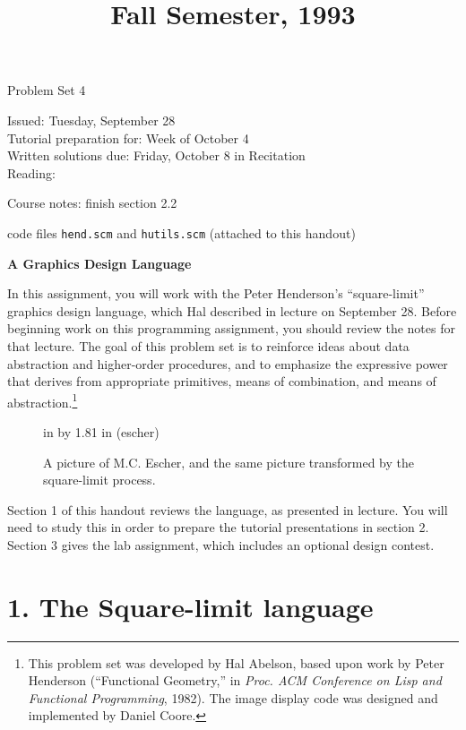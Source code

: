 \documentclass[11pt]{article}
\begin{document}
\title{Fall Semester, 1993}{Problem Set 4}

\medskip

\begin{flushleft}
Issued:  Tuesday, September 28 \\
\smallskip
Tutorial preparation for: Week of October 4\\
\smallskip
Written solutions due: Friday, October 8 in Recitation \\
\smallskip
Reading: 
\begin{tightlist}
\item Course notes: finish section 2.2
\item code files {\tt hend.scm} and {\tt hutils.scm} (attached to this handout)
\end{tightlist}
\end{flushleft}

\begin{center}
{\bf A Graphics Design Language}
\end{center}

In this assignment, you will work with the Peter Henderson's
``square-limit'' graphics design language, which Hal described in
lecture on September 28.  Before beginning work on this programming
assignment, you should review the notes for that lecture.  The goal of
this problem set is to reinforce ideas about data abstraction and
higher-order procedures, and to emphasize the expressive power that
derives from appropriate primitives, means of combination, and means
of abstraction.\footnote{This problem set was developed by Hal
Abelson, based upon work by Peter Henderson (``Functional Geometry,''
in {\em Proc. ACM Conference on Lisp and Functional Programming},
1982).  The image display code was designed and implemented by Daniel
Coore.}

\begin{figure}[b]
 in by 1.81 in (escher)
\caption{{\protect\footnotesize
A picture of M.C. Escher, and the same picture transformed by the
square-limit process.}}
\label{escher}
\end{figure} 

Section 1 of this handout reviews the language, as presented in
lecture.  You will need to study this in order to prepare the
tutorial presentations in section 2.  Section 3 gives the lab assignment,
which includes an optional design contest.


\section{1. The Square-limit language}
\end{document}
